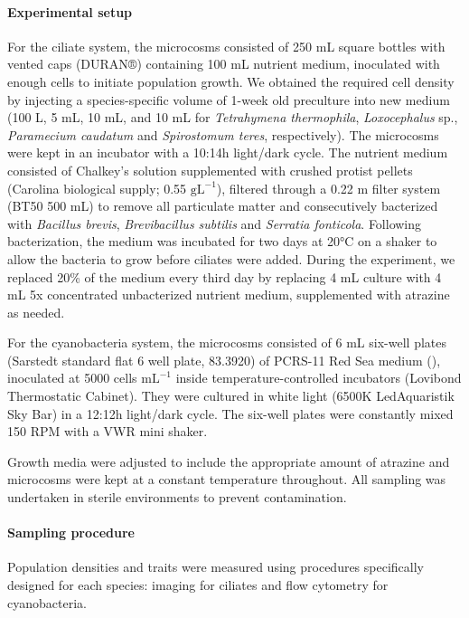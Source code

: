 \documentclass[
  letterpaper,
  DIV=11,
  numbers=noendperiod]{scrartcl}
\let\oldparagraph\paragraph
\renewcommand{\paragraph}[1]{\oldparagraph{#1}\mbox{}}
\begin{document}
\paragraph{Experimental setup}\label{experimental-setup}

For the ciliate system, the microcosms consisted of 250 mL square
bottles with vented caps (DURAN®) containing 100 mL nutrient medium,
inoculated with enough cells to initiate population growth. We obtained
the required cell density by injecting a species-specific volume of
1-week old preculture into new medium (100 \textmu L, 5 mL, 10 mL, and
10 mL for \emph{Tetrahymena thermophila}, \emph{Loxocephalus} sp.,
\emph{Paramecium caudatum} and \emph{Spirostomum teres}, respectively).
The microcosms were kept in an incubator with a 10:14h light/dark cycle.
The nutrient medium consisted of Chalkey's solution supplemented with
crushed protist pellets (Carolina biological supply; 0.55
\(\mathrm{gL}^{-1}\)), filtered through a 0.22 \textmu m filter system
(BT50 500 mL) to remove all particulate matter and consecutively
bacterized with \emph{Bacillus brevis}, \emph{Brevibacillus subtilis}
and \emph{Serratia fonticola}. Following bacterization, the medium was
incubated for two days at 20°C on a shaker to allow the bacteria to grow
before ciliates were added. During the experiment, we replaced 20\% of
the medium every third day by replacing 4 mL culture with 4 mL 5x
concentrated unbacterized nutrient medium, supplemented with atrazine as
needed.

For the cyanobacteria system, the microcosms consisted of 6 mL six-well
plates (Sarstedt standard flat 6 well plate, 83.3920) of PCRS-11 Red Sea
medium (), inoculated at
5000 cells \(\mathrm{mL}^{-1}\) inside temperature-controlled incubators
(Lovibond Thermostatic Cabinet). They were cultured in white light
(6500K LedAquaristik Sky Bar) in a 12:12h light/dark cycle. The six-well
plates were constantly mixed 150 RPM with a VWR mini shaker.

Growth media were adjusted to include the appropriate amount of atrazine
and microcosms were kept at a constant temperature throughout. All
sampling was undertaken in sterile environments to prevent
contamination.

\paragraph{Sampling procedure}\label{sampling-procedure}

Population densities and traits were measured using procedures
specifically designed for each species: imaging for ciliates and flow
cytometry for cyanobacteria.
\end{document}
